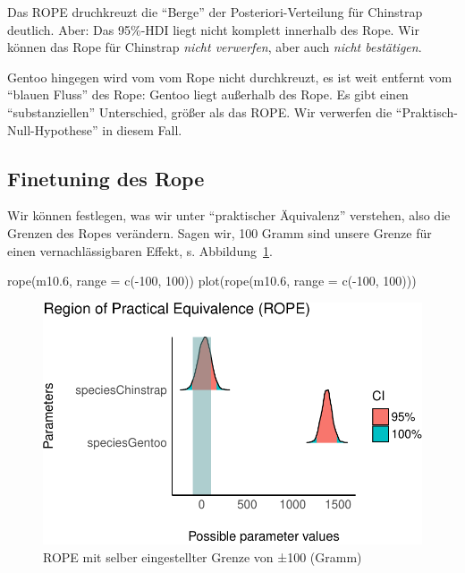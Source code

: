 \documentclass[
  a4paper,
  DIV=11]{scrreprt}
\newenvironment{Shaded}{\begin{snugshade}}{\end{snugshade}}
\newcommand{\AttributeTok}[1]{\textcolor[rgb]{0.40,0.45,0.13}{#1}}
\newcommand{\DecValTok}[1]{\textcolor[rgb]{0.68,0.00,0.00}{#1}}
\newcommand{\FloatTok}[1]{\textcolor[rgb]{0.68,0.00,0.00}{#1}}
\newcommand{\FunctionTok}[1]{\textcolor[rgb]{0.28,0.35,0.67}{#1}}
\newcommand{\NormalTok}[1]{\textcolor[rgb]{0.00,0.23,0.31}{#1}}
\newcommand{\SpecialCharTok}[1]{\textcolor[rgb]{0.37,0.37,0.37}{#1}}
\theoremstyle{definition}
\theoremstyle{remark}
\begin{document}
Das ROPE druchkreuzt die ``Berge'' der Posteriori-Verteilung für
Chinstrap deutlich. Aber: Das 95\%-HDI liegt nicht komplett innerhalb
des Rope. Wir können das Rope für Chinstrap \emph{nicht verwerfen}, aber
auch \emph{nicht bestätigen}.

Gentoo hingegen wird vom vom Rope nicht durchkreuzt, es ist weit
entfernt vom ``blauen Fluss'' des Rope: Gentoo liegt außerhalb des Rope.
Es gibt einen ``substanziellen'' Unterschied, größer als das ROPE. Wir
verwerfen die ``Praktisch-Null-Hypothese'' in diesem Fall.

\hypertarget{finetuning-des-rope}{%
\subsection{Finetuning des Rope}\label{finetuning-des-rope}}

Wir können festlegen, was wir unter ``praktischer Äquivalenz''
verstehen, also die Grenzen des Ropes verändern. Sagen wir, 100 Gramm
sind unsere Grenze für einen vernachlässigbaren Effekt, s.
Abbildung~\ref{fig-rope-range}.

\begin{Shaded}
\begin{Highlighting}[]
\FunctionTok{rope}\NormalTok{(m10}\FloatTok{.6}\NormalTok{, }\AttributeTok{range =} \FunctionTok{c}\NormalTok{(}\SpecialCharTok{{-}}\DecValTok{100}\NormalTok{, }\DecValTok{100}\NormalTok{))}
\FunctionTok{plot}\NormalTok{(}\FunctionTok{rope}\NormalTok{(m10}\FloatTok{.6}\NormalTok{, }\AttributeTok{range =} \FunctionTok{c}\NormalTok{(}\SpecialCharTok{{-}}\DecValTok{100}\NormalTok{, }\DecValTok{100}\NormalTok{)))}
\end{Highlighting}
\end{Shaded}

\begin{figure}[H]

{\centering \includegraphics{./metrische-AV_files/figure-pdf/fig-rope-range-1.pdf}

}

\caption{\label{fig-rope-range}ROPE mit selber eingestellter Grenze von
±100 (Gramm)}

\end{figure}
\end{document}

